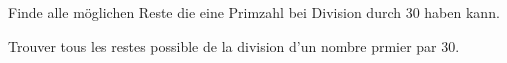 Finde alle möglichen Reste die eine Primzahl bei Division durch 30 haben kann.

\bigskip

Trouver tous les restes possible de la division d'un nombre prmier par 30.